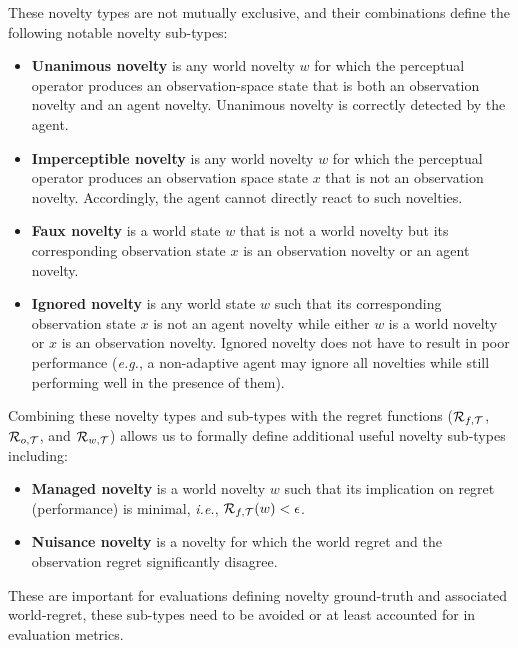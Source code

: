 


These novelty types are not mutually exclusive, and their combinations define the following notable novelty sub-types:
\begin{itemize}
    \item {\bf Unanimous novelty} is any world novelty $w$ for which the perceptual operator produces an observation-space state that is both an observation novelty and an agent novelty. 
    Unanimous novelty is correctly detected by the agent. 
    \item {\bf Imperceptible novelty} is any world novelty $w$ for which the perceptual operator produces an observation space state $x$ that is not an observation novelty. Accordingly, the agent cannot directly react to such novelties. 
    \item {\bf Faux novelty} is a world state $w$ that is not a world novelty but its corresponding observation state $x$ is an observation novelty or an agent novelty. %
    \item {\bf Ignored novelty} is any world state $w$ such that its corresponding observation state $x$ is not an agent novelty while either $w$ is a world novelty or $x$ is an observation novelty. Ignored novelty does not have to result in poor performance (\textit{e.g.}, a non-adaptive agent may ignore all novelties while still performing well in the presence of them). 
\end{itemize}

Combining these novelty types and sub-types with the regret functions (${\cal R}_{f,{\cal T}}$, ${\cal R}_{o,{\cal T}}$, and ${\cal R}_{w,{\cal T}}$) allows us to formally define additional useful novelty sub-types including:
\begin{itemize}
    \item {\bf Managed novelty} is a world novelty $w$ such that
    its implication on regret (performance) is minimal, \textit{i.e.}, ${\cal R}_{f,{\cal T}}(w)<\epsilon$. 
    \item {\bf Nuisance novelty} is a novelty for which the world regret and the observation regret significantly disagree. 
\end{itemize}
These are important for evaluations defining  novelty ground-truth and associated world-regret, these sub-types need to be avoided or at least accounted for in evaluation metrics. 



